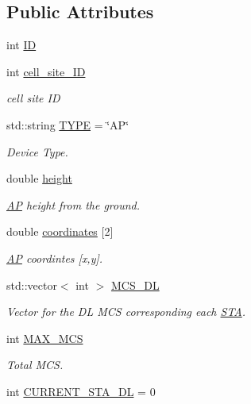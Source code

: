 \subsection*{Public Attributes}
\begin{DoxyCompactItemize}
\item 
int \hyperlink{classAP_a5f6f67357a37b369b8967ce354ede5dd}{I\-D}
\item 
int \hyperlink{classAP_a5304bf9c1816c99a39aa31fa220b54d3}{cell\-\_\-site\-\_\-\-I\-D}
\begin{DoxyCompactList}\small\item\em cell site I\-D \end{DoxyCompactList}\item 
std\-::string \hyperlink{classAP_a94adc8854ed270f4f83e7da969793904}{T\-Y\-P\-E} = \char`\"{}A\-P\char`\"{}
\begin{DoxyCompactList}\small\item\em Device Type. \end{DoxyCompactList}\item 
double \hyperlink{classAP_a27fec97f7b61e45d1350555cf62535d4}{height}
\begin{DoxyCompactList}\small\item\em \hyperlink{classAP}{A\-P} height from the ground. \end{DoxyCompactList}\item 
double \hyperlink{classAP_ac52816d18c4dc26158fa3bd2e63f3bcc}{coordinates} \mbox{[}2\mbox{]}
\begin{DoxyCompactList}\small\item\em \hyperlink{classAP}{A\-P} coordintes \mbox{[}x,y\mbox{]}. \end{DoxyCompactList}\item 
std\-::vector$<$ int $>$ \hyperlink{classAP_a7b8604e8bed67e0abef14f54ba55ec19}{M\-C\-S\-\_\-\-D\-L}
\begin{DoxyCompactList}\small\item\em Vector for the D\-L M\-C\-S corresponding each \hyperlink{classSTA}{S\-T\-A}. \end{DoxyCompactList}\item 
int \hyperlink{classAP_a1fe0d98f0db9557f18e560f8bc96c2fc}{M\-A\-X\-\_\-\-M\-C\-S}
\begin{DoxyCompactList}\small\item\em Total M\-C\-S. \end{DoxyCompactList}\item 
int \hyperlink{classAP_aabddb8414a6a9ecdd51e7e2a03310eb9}{C\-U\-R\-R\-E\-N\-T\-\_\-\-S\-T\-A\-\_\-\-D\-L} = 0

\end{DoxyCompactItemize}

